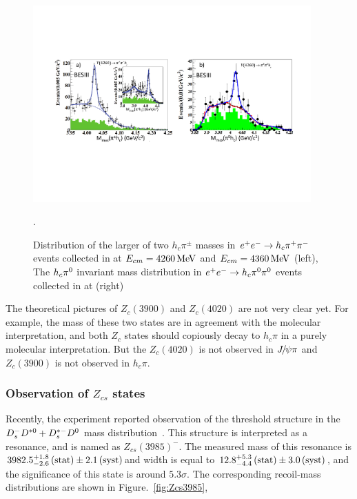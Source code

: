 \begin{figure}[!hbtp]
\centering
   \includegraphics[width=0.95\textwidth]{Figures/01_Introduction/Exotic/charged_particle/bes3_zc4020_pihc} %
   \caption{ 
   Distribution of the larger of two $h_{c}\pi^{\pm}$ masses in ${e^+}{e^-}\rightarrow h_{c}{{\pi}^+}{{\pi}^-}$ events collected in \besiii
   at $E_{cm}=4260 \text{\,Me\kern -0.1em V}$ and $E_{cm}=4360 \text{\,Me\kern -0.1em V}$\supercite{PhysRevLett.111.242001} (left),
   The $h_{c}{{\pi}^0}$ invariant mass distribution in ${e^+}{e^-}\rightarrow h_{c}{{\pi}^0}{{\pi}^0}$ events collected in \besiii at \besiii
   \supercite{PhysRevLett.113.212002} (right)}.
\label{fig:Z4020}
\end{figure}

The theoretical pictures of $Z_c(3900)$ and $Z_c(4020)$ are not very clear yet.
For example,
the mass of these two states are in agreement with the molecular interpretation,
and both $Z_c$ states should copiously decay to $h_{c}\pi$ in a purely molecular interpretation.
But the $Z_c(4020)$ is not observed in ${{J\mskip -3mu/\mskip -2mu\psi}}\pi$
and $Z_c(3900)$ is not observed in $h_{c}\pi$.




\subsubsection{Observation of $Z_{cs}$ states}
\label{subsubsec:01_Zcs_observation}


Recently,
the \besiii experiment reported observation of the threshold structure in the $D_s^-{{D}^{*0}}+{{D}^{*-}_{s}}{{D}^0}$ mass distribution~\supercite{Ablikim:2020hsk}. 
This structure is interpreted as a resonance, 
and is named as $Z_{cs}(3985)^-$. 
The measured mass of this resonance is $3982.5_{-2.6}^{+1.8}\text{\,(stat)}\pm2.1\text{\,(syst)}$\mev and width is equal to $12.8_{-4.4}^{+5.3}\text{\,(stat)}\pm3.0\text{\,(syst)}$\mev,
and the significance of this state is around $5.3\sigma$.
The corresponding \Kp recoil-mass distributions are shown in Figure.~\ref{fig:Zcs3985},

